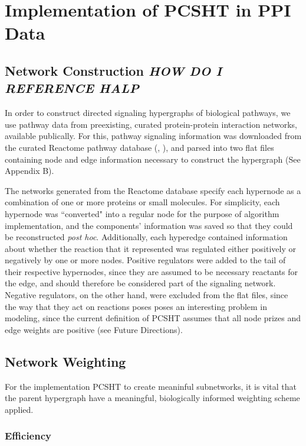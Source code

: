 \documentclass[12pt,twoside]{reedthesis}
\theoremstyle{definition}
\begin{document}
\chapter{Implementation of PCSHT in PPI Data}

  \section{Network Construction \textit{HOW DO I REFERENCE HALP}}
  In order to construct directed signaling hypergraphs of biological pathways, we use pathway data from preexisting, curated protein-protein interaction networks, available publically. For this, pathway signaling information was downloaded from the curated Reactome pathway database (\cite{Croft2014}, \cite{Milacic2012}), and parsed into two flat files containing node and edge information necessary to construct the hypergraph (See Appendix B).\par
  The networks generated from the Reactome database specify each hypernode as a combination of one or more proteins or small molecules. For simplicity, each hypernode was ``converted" into a regular node for the purpose of algorithm implementation, and the components' information was saved so that they could be reconstructed \textit{post hoc}. Additionally, each hyperedge contained information about whether the reaction that it represented was regulated either positively or negatively by one or more nodes. Positive regulators were added to the tail of their respective hypernodes, since they are assumed to be necessary reactants for the edge, and should therefore be considered part of the signaling network. Negative regulators, on the other hand, were excluded from the flat files, since the way that they act on reactions poses poses an interesting problem in modeling, since the current definition of PCSHT assumes that all node prizes and edge weights are positive (see Future Directions).\par

  \section{Network Weighting}

    For the implementation PCSHT to create meaninful subnetworks, it is vital that the parent hypergraph have a meaningful, biologically informed weighting scheme applied.

    \subsection{Efficiency}
\end{document}
